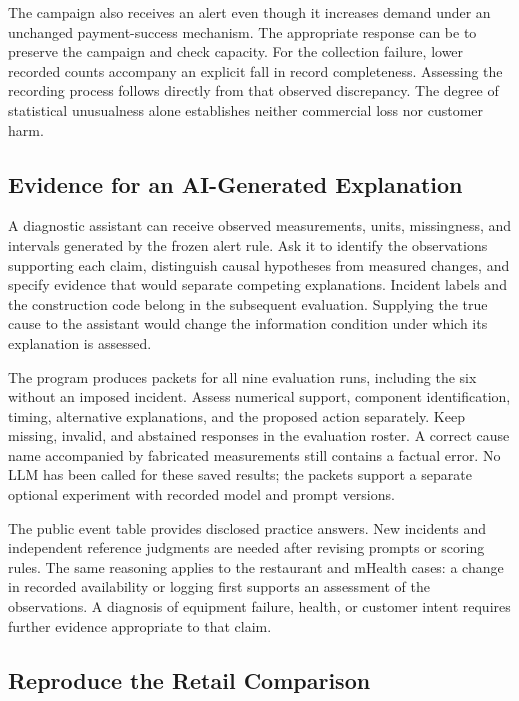 The campaign also receives an alert even though it increases demand
under an unchanged payment-success mechanism. The appropriate response
can be to preserve the campaign and check capacity. For the collection
failure, lower recorded counts accompany an explicit fall in record
completeness. Assessing the recording process follows directly from that
observed discrepancy. The degree of statistical unusualness alone
establishes neither commercial loss nor customer harm.

\hypertarget{M07-evidence-for-an-ai-generated-explanation}{%
\subsection{Evidence for an AI-Generated
Explanation}\label{M07-evidence-for-an-ai-generated-explanation}}

\noindent \noindent A diagnostic assistant can receive observed measurements,
units, missingness, and intervals generated by the frozen alert rule.
Ask it to identify the observations supporting each claim, distinguish
causal hypotheses from measured changes, and specify evidence that would
separate competing explanations. Incident labels and the construction
code belong in the subsequent evaluation. Supplying the true cause to
the assistant would change the information condition under which its
explanation is assessed.

The program produces packets for all nine evaluation runs, including the
six without an imposed incident. Assess numerical support, component
identification, timing, alternative explanations, and the proposed
action separately. Keep missing, invalid, and abstained responses in the
evaluation roster. A correct cause name accompanied by fabricated
measurements still contains a factual error. No LLM has been called for
these saved results; the packets support a separate optional experiment
with recorded model and prompt versions.

The public event table provides disclosed practice answers. New
incidents and independent reference judgments are needed after revising
prompts or scoring rules. The same reasoning applies to the restaurant
and mHealth cases: a change in recorded availability or logging first
supports an assessment of the observations. A diagnosis of equipment
failure, health, or customer intent requires further evidence
appropriate to that claim.

\hypertarget{M07-reproduce-the-retail-comparison}{%
\subsection{Reproduce the Retail
Comparison}\label{M07-reproduce-the-retail-comparison}}

